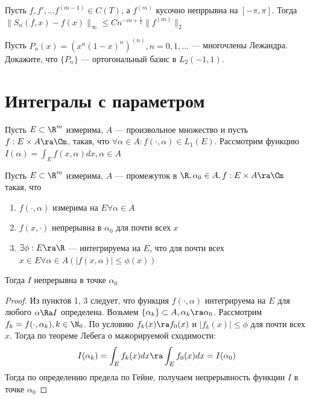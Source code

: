 \begin{corollary}
    Пусть \(f, f', \dots f^{(m - 1)} \in C(T)\), а \(f^{(m)}\) кусочно непррывна на \([-\pi, \pi]\). Тогда \(\|S_n(f, x) - f(x)\|_{\infty} \le Cn^{-m + \frac{1}{2}}\|f^{(m)}\|_2\)
\end{corollary}

\begin{problem}
    Пусть \(P_n(x) = (x^n(1 - x)^n)^{(n)}, n = 0, 1, \dots\) --- многочлены Лежандра. Докажите, что \(\{P_n\}\) --- ортогональный базис в \(L_2(-1, 1)\).
\end{problem}

\section{Интегралы с параметром}
Пусть \(E \subset \R^m\) измерима, \(A\) --- произвольное множество и пусть \(f: E \times A \ra \Cm\), такая, что \(\forall \alpha \in A: f(\cdot, \alpha) \in L_1(E)\). Рассмотрим функцию \(I(\alpha) = \int_E f(x, \alpha) dx, \alpha \in A\)

\begin{theorem}
    Пусть \(E \subset \R^m\) измерима, \(A\) --- промежуток в \(\R, \alpha_0 \in A, f: E \times A \ra \Cm\) такая, что 
    \begin{enumerate}
        \item \(f(\cdot, \alpha)\) измерима на \(E \forall \alpha \in A\)
        \item \(f(x, \cdot)\) непрерывна в \(\alpha_0\) для почти всех \(x\)
        \item \(\exists \phi: E \ra \R\) --- интегрируема на \(E\), что для почти всех \(x \in E \forall \alpha \in A \left( |f(x, \alpha)| \le \phi(x) \right)\)
    \end{enumerate}
    Тогда \(I\) непрерывна в точке \(\alpha_0\)
\end{theorem}
\begin{proof}
    Из пунктов 1, 3 следует, что функция \(f(\cdot, \alpha)\) интегрируема на \(E\) для любого \(\alpha \Ra I\) определена. Возьмем \(\{\alpha_k\} \subset A, \alpha_k \ra \alpha_0\). Рассмотрим \(f_k = f(\cdot, \alpha_k), k \in \N_0\). По условию \(f_k(x) \ra f_0(x)\) и \(|f_k(x)| \le \phi\) для почти всех \(x\). Тогда по теореме Лебега о мажорируемой сходимости:
    \[I(\alpha_k) = \int_E f_k(x)dx \ra \int_E f_0(x)dx = I(\alpha_0)\]
    Тогда по определению предела по Гейне, получаем непрерывность функции \(I\) в точке \(\alpha_0\)
\end{proof}

